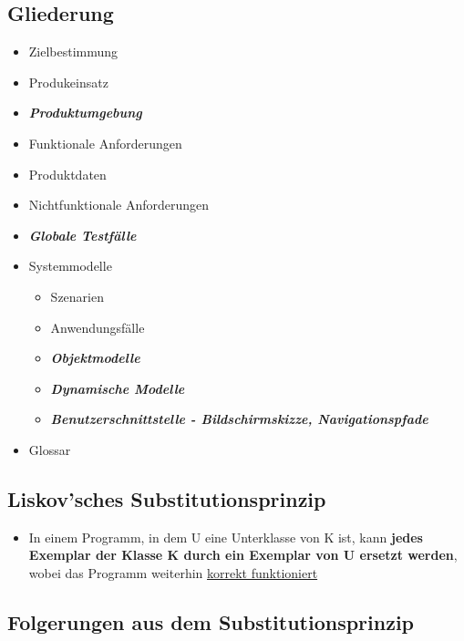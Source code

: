 		\newpage
		\subsection{Gliederung}
				
			\begin{itemize}
				\item Zielbestimmung 
				\item Produkeinsatz
				\item \textbf{\textit{Produktumgebung}}
				\item Funktionale Anforderungen
				\item Produktdaten
				\item Nichtfunktionale Anforderungen
				\item \textbf{\textit{Globale Testfälle}}
				\item Systemmodelle
				\begin{itemize}
					\item Szenarien
					\item Anwendungsfälle
					\item \textbf{\textit{Objektmodelle}}
					\item \textbf{\textit{Dynamische Modelle}}
					\item \textbf{\textit{Benutzerschnittstelle - Bildschirmskizze, Navigationspfade}}
				\end{itemize}
				\item Glossar
			\end{itemize}
				
		\subsection{Liskov'sches Substitutionsprinzip}
			
			\begin{itemize}
				\item In einem Programm, in dem U eine Unterklasse von K ist, kann \textbf{jedes Exemplar der Klasse K durch ein Exemplar von U ersetzt werden}, wobei das Programm weiterhin \underline{korrekt funktioniert}
			\end{itemize}
				
		\newpage
		\subsection{Folgerungen aus dem Substitutionsprinzip}
			

